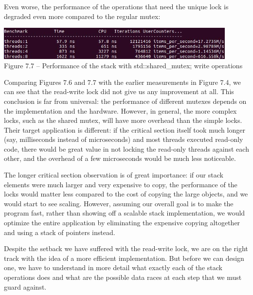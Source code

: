 Even worse, the performance of the operations that need the unique lock is degraded even more compared to the regular mutex:

\begin{center}
\includegraphics[width=0.9\textwidth]{content/2/chapter7/images/7.jpg}\\
Figure 7.7 – Performance of the stack with std::shared\_mutex; write operations
\end{center}

Comparing Figures 7.6 and 7.7 with the earlier measurements in Figure 7.4, we can see that the read-write lock did not give us any improvement at all. This conclusion is far from universal: the performance of different mutexes depends on the implementation and the hardware. However, in general, the more complex locks, such as the shared mutex, will have more overhead than the simple locks. Their target application is different: if the critical section itself took much longer (say, milliseconds instead of microseconds) and most threads executed read-only code, there would be great value in not locking the read-only threads against each other, and the overhead of a few microseconds would be much less noticeable.

The longer critical section observation is of great importance: if our stack elements were much larger and very expensive to copy, the performance of the locks would matter less compared to the cost of copying the large objects, and we would start to see scaling. However, assuming our overall goal is to make the program fast, rather than showing off a scalable stack implementation, we would optimize the entire application by eliminating the expensive copying altogether and using a stack of pointers instead.

Despite the setback we have suffered with the read-write lock, we are on the right track with the idea of a more efficient implementation. But before we can design one, we have to understand in more detail what exactly each of the stack operations does and what are the possible data races at each step that we must guard against.


